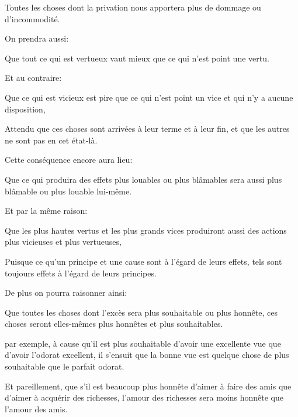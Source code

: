 \begin{lieu}
	Toutes les choses dont la privation nous apportera plus de dommage ou d'incommodité.
\end{lieu}

\bigbreak

On prendra aussi:

\begin{lieu}
	Que tout ce qui est vertueux vaut mieux que ce qui n'est point une vertu.
\end{lieu}

Et au contraire:

\begin{lieu}
	Que ce qui est vicieux est pire que ce qui n'est point un vice et qui n'y a aucune disposition,
\end{lieu}

Attendu que ces choses sont arrivées à leur terme et à leur fin, et que les autres ne sont pas en cet état-là.

\bigbreak

Cette conséquence encore aura lieu:

\begin{lieu}
	Que ce qui produira des effets plus louables ou plus blâmables sera aussi plus blâmable ou plus louable
	lui-même.
\end{lieu}

Et par la même raison:

\begin{lieu}
	Que les plus hautes vertus et les plus grands vices produiront aussi des actions plus vicieuses et plus
	vertueuses,
\end{lieu}

Puisque ce qu'un principe et une cause sont à l’égard de leurs effets, tels sont toujours effets à l'égard de
leurs principes.

\bigbreak

De plus on pourra raisonner ainsi:

\begin{lieu}
	Que toutes les choses dont l'excès sera plus souhaitable ou plus honnête, ces choses seront elles-mêmes
	plus honnêtes et plus souhaitables.
\end{lieu}

par exemple, à cause qu'il est plus souhaitable d'avoir une excellente vue que d'avoir l'odorat excellent, il
s'ensuit que la bonne vue est quelque chose de plus souhaitable que le parfait odorat.

Et pareillement, que s'il est beaucoup plus honnête d'aimer à faire des amis que d'aimer à acquérir des richesses,
l'amour des richesses sera moins honnête que l'amour des amis.


